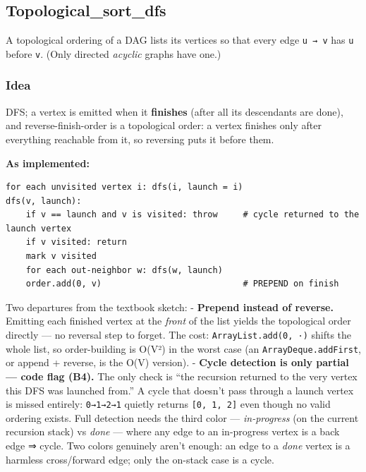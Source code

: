 \documentclass[
  10pt,
  letterpaper,
  onecolumn]{article}
\begin{document}
\hypertarget{topological_sort_dfs}{%
\subsection{Topological\_sort\_dfs}\label{topological_sort_dfs}}

A topological ordering of a DAG lists its vertices so that every edge
\texttt{u\ →\ v} has \texttt{u} before \texttt{v}. (Only directed
\emph{acyclic} graphs have one.)

\hypertarget{idea-14}{%
\subsubsection{Idea}\label{idea-14}}

DFS; a vertex is emitted when it \textbf{finishes} (after all its
descendants are done), and reverse-finish-order is a topological order:
a vertex finishes only after everything reachable from it, so reversing
puts it before them.

\textbf{As implemented:}

\begin{verbatim}
for each unvisited vertex i: dfs(i, launch = i)
dfs(v, launch):
    if v == launch and v is visited: throw     # cycle returned to the launch vertex
    if v visited: return
    mark v visited
    for each out-neighbor w: dfs(w, launch)
    order.add(0, v)                            # PREPEND on finish
\end{verbatim}

Two departures from the textbook sketch: - \textbf{Prepend instead of
reverse.} Emitting each finished vertex at the \emph{front} of the list
yields the topological order directly --- no reversal step to forget.
The cost: \texttt{ArrayList.add(0,\ ·)} shifts the whole list, so
order-building is O(V²) in the worst case (an
\texttt{ArrayDeque.addFirst}, or append + reverse, is the O(V) version).
- \textbf{Cycle detection is only partial --- code flag (B4).} The only
check is ``the recursion returned to the very vertex this DFS was
launched from.'' A cycle that doesn't pass through a launch vertex is
missed entirely: \texttt{0→1→2→1} quietly returns
\texttt{{[}0,\ 1,\ 2{]}} even though no valid ordering exists. Full
detection needs the third color --- \emph{in-progress} (on the current
recursion stack) vs \emph{done} --- where any edge to an in-progress
vertex is a back edge ⇒ cycle. Two colors genuinely aren't enough: an
edge to a \emph{done} vertex is a harmless cross/forward edge; only the
on-stack case is a cycle.
\end{document}
